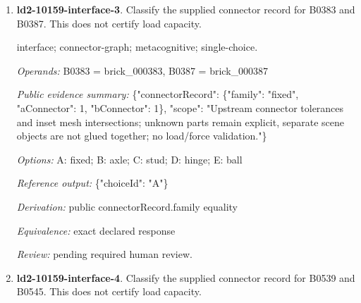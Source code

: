 \begin{enumerate}
\par{\small interface; connector-graph; metacognitive; single-choice.\par\textit{Operands:} B0486 = brick\_000486, B0454 = brick\_000454\par\textit{Public evidence summary:} \{"connectorRecord": \{"family": "ball", "aConnector": 4, "bConnector": 0\}, "scope": "Upstream connector tolerances and inset mesh intersections; unknown parts remain explicit, separate scene objects are not glued together; no load/force validation."\}\par\textit{Options:} A: axle; B: stud; C: ball; D: fixed; E: hinge\par\textit{Reference output:} \{"choiceId": "C"\}\par\textit{Derivation:} public connectorRecord.family equality\par\textit{Equivalence:} exact declared response\par\textit{Review:} machine checks passed; no human certification.}
\item \textbf{ld2-10159-interface-3}. Classify the supplied connector record for B0383 and B0387. This does not certify load capacity.
\par{\small interface; connector-graph; metacognitive; single-choice.\par\textit{Operands:} B0383 = brick\_000383, B0387 = brick\_000387\par\textit{Public evidence summary:} \{"connectorRecord": \{"family": "fixed", "aConnector": 1, "bConnector": 1\}, "scope": "Upstream connector tolerances and inset mesh intersections; unknown parts remain explicit, separate scene objects are not glued together; no load/force validation."\}\par\textit{Options:} A: fixed; B: axle; C: stud; D: hinge; E: ball\par\textit{Reference output:} \{"choiceId": "A"\}\par\textit{Derivation:} public connectorRecord.family equality\par\textit{Equivalence:} exact declared response\par\textit{Review:} pending required human review.}
\item \textbf{ld2-10159-interface-4}. Classify the supplied connector record for B0539 and B0545. This does not certify load capacity.

\end{enumerate}
